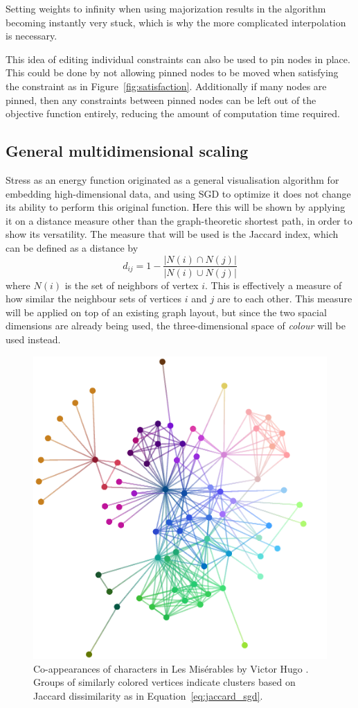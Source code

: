 Setting weights to infinity when using majorization results in the algorithm becoming instantly very stuck, which is why the more complicated interpolation \cite{Brandes2011} is necessary.

This idea of editing individual constraints can also be used to pin nodes in place. This could be done by not allowing pinned nodes to be moved when satisfying the constraint as in Figure~\ref{fig:satisfaction}. Additionally if many nodes are pinned, then any constraints between pinned nodes can be left out of the objective function entirely, reducing the amount of computation time required.


\subsection{General multidimensional scaling}
\label{sec:normal_mds}
Stress as an energy function originated as a general visualisation algorithm for embedding high-dimensional data, and using SGD to optimize it does not change its ability to perform this original function. Here this will be shown by applying it on a distance measure other than the graph-theoretic shortest path, in order to show its versatility. The measure that will be used is the Jaccard index, which can be defined as a distance by
\begin{equation}
  d_{ij} = 1 - \frac{|N(i) \cap N(j)|}{|N(i) \cup N(j)|}
  \label{eq:jaccard_sgd}
\end{equation}
where $N(i)$ is the set of neighbors of vertex $i$. This is effectively a measure of how similar the neighbour sets of vertices $i$ and $j$ are to each other.
This measure will be applied on top of an existing graph layout, but since the two spacial dimensions are already being used, the three-dimensional space of \emph{colour} will be used instead.

\begin{figure}
  \centering
  \includegraphics[width=.6\textwidth]{stress/lesmis.png}
  \caption[A graph \texttt{lesmis} with node colours embedded in RGB space]{
  Co-appearances of characters in Les Mis\'erables by Victor Hugo \cite{Knuth1993}.
  Groups of similarly colored vertices indicate clusters based on Jaccard dissimilarity as in Equation~\eqref{eq:jaccard_sgd}.
  }
  \label{fig:jaccard}
\end{figure}

